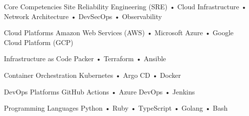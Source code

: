 

\begin{cvskills}

  \cvskill
    {Core Competencies} %
    {Site Reliability Engineering (SRE) • Cloud Infrastructure • Network Architecture • DevSecOps • Observability} %

  \cvskill
    {Cloud Platforms} %
    {Amazon Web Services (AWS) • Microsoft Azure • Google Cloud Platform (GCP)} %

  \cvskill
    {Infrastructure as Code} %
    {Packer • Terraform • Ansible} %

  \cvskill
    {Container Orchestration} %
    {Kubernetes • Argo CD • Docker} %

  \cvskill
    {DevOps Platforms} %
    {GitHub Actions • Azure DevOps • Jenkins} %

  \cvskill
    {Programming Languages} %
    {Python • Ruby • TypeScript • Golang • Bash} %

\end{cvskills}
